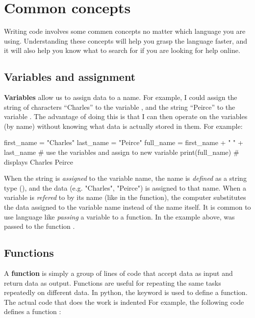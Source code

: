 \section{Common concepts}

Writing code involves some commen concepts no matter which language you are using. Understanding these concepts will help you grasp the language faster, and it will also help you know what to search for if you are looking for help online.

\subsection{Variables and assignment}

\textbf{Variables} allow us to assign data to a name. For example, I could assign the string of characters ``Charles'' to the variable , and the string ``Peirce'' to the variable . The advantage of doing this is that I can then operate on the variables (by name) without knowing what data is actually stored in them. For example:

\begin{pycode}
    first_name = "Charles"
    last_name = "Peirce"
    full_name = first_name + " " + last_name # use the variables and assign to new variable
    print(full_name) # displays  Charles Peirce
\end{pycode}

When the string is \textit{assigned} to the variable name, the name is \textit{defined} as a string type (), and the data (e.g. "Charles", "Peirce") is assigned to that name. When a variable is \textit{refered} to by its name (like in the  function), the computer substitutes the data assigned to the variable name instead of the name itself. It is common to use language like \textit{passing} a variable to a function. In the example above,  was passed to the function .

\subsection{Functions}

A \textbf{function} is simply a group of lines of code that accept data as input and return data as output. Functions are useful for repeating the same tasks repeatedly on different data. In python, the  keyword is used to define a function. The actual code that does the work is indented For example, the following code defines a function :


